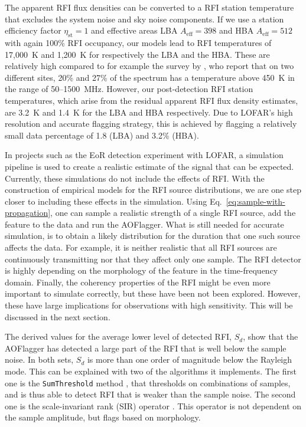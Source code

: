 \documentclass[useAMS,usenatbib]{mn2e}
\begin{document}
The apparent RFI flux densities can be converted to a RFI station temperature that excludes the system noise and sky noise components. If we use a station efficiency factor $\eta_\textrm{st}=1$ and effective areas LBA $A_\textrm{eff}=398$ and HBA $A_\textrm{eff}=512$ with again 100\% RFI occupancy, our models lead to RFI temperatures of 17,000~K and 1,200~K for respectively the LBA and the HBA. These are relatively high compared to for example the survey by \citet{lf-interference-temperature-rogers}, who report that on two different sites, 20\% and 27\% of the spectrum has a temperature above 450~K in the range of 50--1500~MHz. However, our post-detection RFI station temperatures, which arise from the residual apparent RFI flux density estimates, are 3.2~K and 1.4~K for the LBA and HBA respectively. Due to LOFAR's high resolution and accurate flagging strategy, this is achieved by flagging a relatively small data percentage of 1.8 (LBA) and 3.2\% (HBA).

In projects such as the EoR detection experiment with LOFAR, a simulation pipeline is used to create a realistic estimate of the signal that can be expected. Currently, these simulations do not include the effects of RFI. With the construction of empirical models for the RFI source distributions, we are one step closer to including these effects in the simulation. Using Eq.~\eqref{eq:sample-with-propagation}, one can sample a realistic strength of a single RFI source, add the feature to the data and run the AOFlagger. What is still needed for accurate simulation, is to obtain a likely distribution for the duration that one such source affects the data. For example, it is neither realistic that all RFI sources are continuously transmitting nor that they affect only one sample. The RFI detector is highly depending on the morphology of the feature in the time-frequency domain. Finally, the coherency properties of the RFI might be even more important to simulate correctly, but these have been not been explored. However, these have large implications for observations with high sensitivity. This will be discussed in the next section. 

The derived values for the average lower level of detected RFI, $S_d$, show that the AOFlagger has detected a large part of the RFI that is well below the sample noise. In both sets, $S_d$ is more than one order of magnitude below the Rayleigh mode. This can be explained with two of the algorithms it implements. The first one is the {\tt SumThreshold} method \citep{post-correlation-rfi-classification}, that thresholds on combinations of samples, and is thus able to detect RFI that is weaker than the sample noise. The second one is the scale-invariant rank (SIR) operator \citep{scale-invariant-rank-operator}. This operator is not dependent on the sample amplitude, but flags based on morphology.
\end{document}

